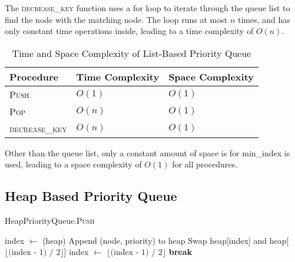 \documentclass[12pt]{article}
\begin{document}
The \textsc{decrease\_key} function uses a for loop to iterate through
the queue list to find the node with the matching node. The loop runs
at most $n$ times, and has only constant time operations inside, leading
to a time complexity of $O(n)$.


\begin{table}[H]
    \centering
    \begin{threeparttable}
        \caption{Time and Space Complexity of List-Based Priority Queue}
        \begin{tabular}{@{}lll@{}}
            \toprule
            \textbf{Procedure} & \textbf{Time Complexity} & \textbf{Space Complexity} \\ \midrule
            \textsc{Push}      & $O(1)$                  & $O(1)$                    \\
            \textsc{Pop}       & $O(n)$                  & $O(1)$                    \\
            \textsc{decrease\_key} & $O(n)$              & $O(1)$                    \\
            \bottomrule
        \end{tabular}
    \end{threeparttable}
\end{table}

Other than the queue list, only a constant amount of space is for min\_index
is used, leading to a space complexity of $O(1)$ for all procedures.

\subsection{Heap Based Priority Queue}

\begin{algorithm}[H]
    \caption{HeapPriorityQueue.\textsc{Push}}
    \begin{algorithmic}[1]
        \State index $\gets$ (heap)
        \State Append (node, priority) to heap
         
                \State Swap heap[index] and heap[$\lfloor \text{(index - 1) / 2} \rfloor$]
                \State index $\gets$ $\lfloor \text{(index - 1) / 2} \rfloor$
            \Else
                \State \textbf{break}
            \EndIf
        \EndWhile
    \end{algorithmic}
\end{algorithm}
\end{document}
